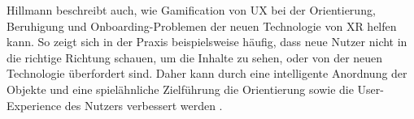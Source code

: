 Hillmann beschreibt auch, wie Gamification von UX bei der Orientierung, Beruhigung und Onboarding-Problemen der neuen Technologie von XR helfen kann.
So zeigt sich in der Praxis beispielsweise häufig, dass neue Nutzer nicht in die richtige Richtung schauen, um die Inhalte zu sehen, oder von der neuen Technologie überfordert sind.
Daher kann durch eine intelligente Anordnung der Objekte und eine spielähnliche Zielführung die Orientierung sowie die User-Experience des Nutzers verbessert werden \autocite[S.67]{hillmann2021ux}.



